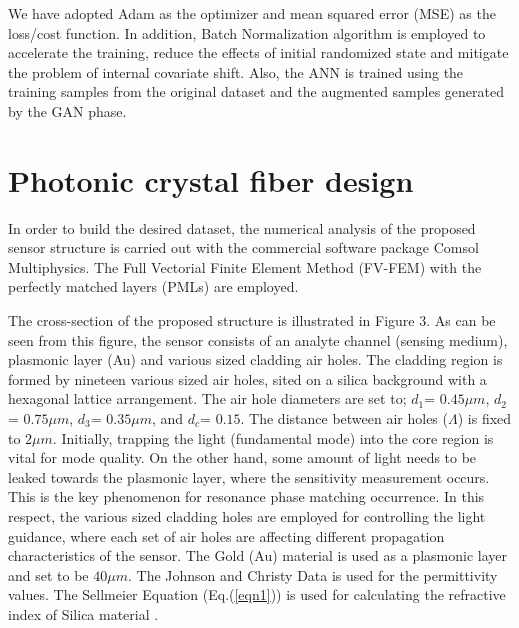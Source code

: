 \documentclass[journal]{IEEEtran}
\begin{document}
We have adopted Adam \cite{kingma2014adam}as the optimizer and mean squared error (MSE) as the loss/cost function. In addition, Batch Normalization algorithm \cite{ioffe2015batch} is employed to accelerate the training, reduce the effects of initial randomized state and mitigate the problem of internal covariate shift. Also, the ANN is trained using the training samples from the original dataset and the augmented samples generated by the GAN phase.

\section{Photonic crystal fiber design}
\label{sec:pcf}

In order to build the desired dataset, the numerical analysis of the proposed sensor structure is carried out with the commercial software package Comsol Multiphysics. The Full Vectorial Finite Element Method (FV-FEM) with the perfectly matched layers (PMLs) \cite{koshiba2002full} are employed.

The cross-section of the proposed structure is illustrated in Figure 3. As can be seen from this figure, the sensor consists of an analyte channel (sensing medium), plasmonic layer (Au) and various sized cladding air holes. The cladding region is formed by nineteen various sized air holes, sited on a silica background with a hexagonal lattice arrangement. The air hole diameters are set to;  $d_1$= $0.45 \mu m$, $d_2$= $0.75 \mu m$, $d_3$= $0.35 \mu m$, and  $d_c$= $0.15$. The distance between air holes ($\Lambda$) is fixed to $2 \mu m$. Initially, trapping the light (fundamental mode) into the core region is vital for mode quality. On the other hand, some amount of light needs to be leaked towards the plasmonic layer, where the sensitivity measurement occurs. This is the key phenomenon for resonance phase matching occurrence. In this respect, the various sized cladding holes are employed for controlling the light guidance, where each set of air holes are affecting different propagation characteristics of the sensor. The Gold (Au) material is used as a plasmonic layer and set to be $40 \mu m$. The Johnson and Christy Data \cite{johnson1972optical} is used for the permittivity values. The Sellmeier Equation (Eq.(\ref{eqn1})) is used for calculating the refractive index of Silica material \cite{bjarklev2003PCF}.
\end{document}
